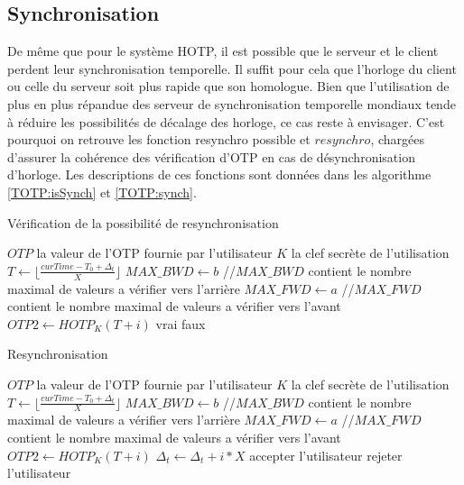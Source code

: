 \documentclass{../res/univ-projet}
\begin{document}
  \subsection{Synchronisation}
  \label{OTP:syncSec}
    De même que pour le système \og{}HOTP\fg{}, il est possible que le serveur et le client perdent leur synchronisation temporelle. Il suffit pour cela que
    l'horloge du client ou celle du serveur soit plus rapide que son homologue. Bien que l'utilisation de plus en plus répandue des serveur de synchronisation 
    temporelle mondiaux tende à réduire les possibilités de décalage des horloge, ce cas reste à envisager. C'est pourquoi on retrouve les fonction \og{}resynchro 
    possible\fg{} et $resynchro$, chargées d'assurer la cohérence des vérification d'OTP en cas de désynchronisation d'horloge. Les descriptions de ces fonctions sont 
    données dans les algorithme \ref{TOTP:isSynch} et \ref{TOTP:synch}.
    \begin{algorithm}
      \caption{Vérification de la possibilité de resynchronisation}
      \label{TOTP:isSynch}
      
      \begin{algorithmic}
        \REQUIRE $OTP$ la valeur de l'OTP fournie par l'utilisateur
        \REQUIRE $K$ la clef secrète de l'utilisation
        \STATE $T \leftarrow \lfloor{}\frac{curTime - T_0 + \Delta_t}{X}\rfloor{}$
        \STATE $MAX\_BWD \leftarrow b$ //$MAX\_BWD$ contient le nombre maximal de valeurs a vérifier vers l'arrière
        \STATE $MAX\_FWD \leftarrow a$ //$MAX\_FWD$ contient le nombre maximal de valeurs a vérifier vers l'avant
          \STATE $OTP2 \leftarrow HOTP_K(T + i)$
            \RETURN vrai
          \ENDIF
        \ENDFOR
        \RETURN faux
      \end{algorithmic}
    \end{algorithm}
    
    \begin{algorithm}
      \caption{Resynchronisation}
      \label{TOTP:synch}
      
      \begin{algorithmic}
        \REQUIRE $OTP$ la valeur de l'OTP fournie par l'utilisateur
        \REQUIRE $K$ la clef secrète de l'utilisation
        \STATE $T \leftarrow \lfloor{}\frac{curTime - T_0 + \Delta_t}{X}\rfloor{}$
        \STATE $MAX\_BWD \leftarrow b$ //$MAX\_BWD$ contient le nombre maximal de valeurs a vérifier vers l'arrière
        \STATE $MAX\_FWD \leftarrow a$ //$MAX\_FWD$ contient le nombre maximal de valeurs a vérifier vers l'avant
          \STATE $OTP2 \leftarrow HOTP_K(T + i)$
            \STATE $\Delta_t \leftarrow \Delta_t + i * X$
            \STATE accepter l'utilisateur
          \ENDIF
        \ENDFOR
        \STATE rejeter l'utilisateur
      \end{algorithmic}
    \end{algorithm}
    
\end{document}
